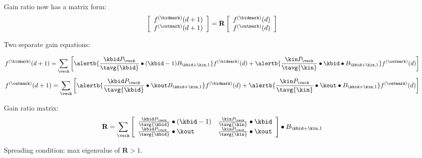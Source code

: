 \begin{frame}[plain]

  
  
    Gain ratio now has a matrix form:
    $$
    \left[
      \begin{array}{c}
        f^{\textnormal{(\bidmark)}}(d+1) \\
        f^{\textnormal{(\outmark)}}(d+1)
      \end{array}
    \right]
    =
    \mathbf{R} 
    \left[
      \begin{array}{c}
        f^{\textnormal{(\bidmark)}}(d) \\
        f^{\textnormal{(\outmark)}}(d)
      \end{array}
    \right]
    $$
  
    Two separate gain equations:
  
  {
    \small
    $$
    f^{\textnormal{(\bidmark)}}(d+1) 
    =
    \sum_{\veck}
    \left[
    \alertb{
      \frac{\kbid P_{\veck}}{\tavg{\kbid}}
      \bullet
      (\kbid-1)
      B_{\kbid+\kin,1}
    }
    f^{\textnormal{(\bidmark)}}(d) 
    +
    \alertb{
      \frac{\kin P_{\veck}}{\tavg{\kin}}
      \bullet
      \kbid
      \bullet
      B_{\kbid+\kin,1}
    }
    f^{\textnormal{(\outmark)}}(d) 
    \right]
    $$
    }
    {
      $$
      f^{\textnormal{(\outmark)}}(d+1) 
      =
      \sum_{\veck}
      \left[
      \alertb{
        \frac{\kbid P_{\veck}}{\tavg{\kbid}}
        \bullet
        \kout
        B_{\kbid+\kin,1}
      }
      f^{\textnormal{(\bidmark)}}(d) 
      +
      \alertb{
        \frac{\kin P_{\veck}}{\tavg{\kin}}
        \bullet
        \kout
        \bullet
        B_{\kbid+\kin,1}
      }
      f^{\textnormal{(\outmark)}}(d) 
      \right]
    $$
    }
    
  
    Gain ratio matrix:
    $$
    \mathbf{R}
    =
    \sum_{\veck}
    \left[
      \begin{array}{ll}
        \frac{\kbid P_{\veck}}{\tavg{\kbid}}
        \bullet
        (\kbid-1)
        &
        \frac{\kin P_{\veck}}{\tavg{\kin}}
        \bullet
        \kbid
        \\
        \frac{\kbid P_{\veck}}{\tavg{\kbid}}
        \bullet
        \kout
        &
        \frac{\kin P_{\veck}}{\tavg{\kin}}
        \bullet
        \kout
      \end{array}
    \right]
    \bullet
    B_{\kbid+\kin,1}
    $$
  
    Spreading condition:
    max eigenvalue of $\mathbf{R} > 1$.
  




\end{frame}
